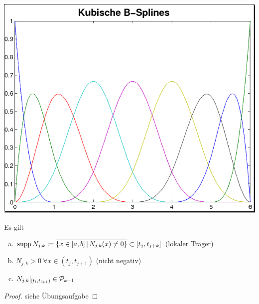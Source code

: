 \begin{image}{}
  \includegraphics[width=\linewidth]{images/kubBsplines.png}
\end{image}\label{6.2.6(3)}

\begin{Kore}
  Es gilt
  \begin{enumerate}[a)]
  \item $\operatorname{supp} N_{j,k} \coloneqq 
    \overline{\left\{ x\in[a,b]\,\middle\vert
        \, N_{j,k}(x)\neq 0\right\}} \subset [t_j, t_{j+k}]$
    (lokaler Träger)
  \item $N_{j,k}>0 ~\forall x\in(t_j,t_{j+1})$ (nicht negativ)
  \item $N_{j,k}\vert_{[t_l,t_{l+1})}\in \mathcal{P}_{k-1}$
  \end{enumerate}
  \begin{proof}
    siehe Übungsaufgabe
  \end{proof}
\end{Kore}


